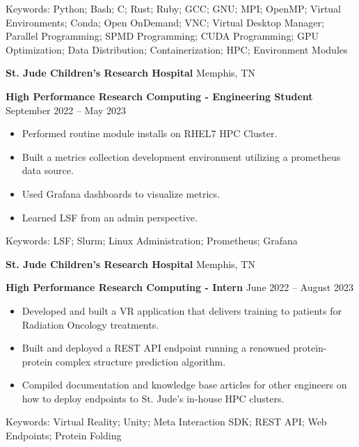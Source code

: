\documentclass[11pt]{article}
\begin{document}
\vspace{6pt}

Keywords: Python; Bash; C; Rust; Ruby; GCC; GNU; MPI; OpenMP; Virtual Environments; Conda; Open OnDemand; VNC; Virtual Desktop Manager; Parallel Programming; SPMD Programming; CUDA Programming; GPU Optimization; Data Distribution; Containerization; HPC; Environment Modules

\vspace{12pt}

\textbf{St. Jude Children's Research Hospital} \hfill Memphis, TN

\textbf{High Performance Research Computing - Engineering Student} \hfill September 2022 – May 2023
\begin{itemize}[noitemsep]
    \item Performed routine module installs on RHEL7 HPC Cluster.
    \item Built a metrics collection development environment utilizing a prometheus data source.
    \item Used Grafana dashboards to visualize metrics.
    \item Learned LSF from an admin perspective.
\end{itemize}

\vspace{6pt}

Keywords: LSF; Slurm; Linux Administration; Prometheus; Grafana

\vspace{12pt}

\textbf{St. Jude Children's Research Hospital} \hfill Memphis, TN

\textbf{High Performance Research Computing - Intern} \hfill June 2022 – August 2023
\begin{itemize}[noitemsep]
    \item Developed and built a VR application that delivers training to patients for Radiation Oncology treatments.
    \item Built and deployed a REST API endpoint running a renowned protein-protein complex structure prediction algorithm.
    \item Compiled documentation and knowledge base articles for other engineers on how to deploy endpoints to St. Jude’s in-house HPC clusters.
\end{itemize}

\vspace{6pt}

Keywords: Virtual Reality; Unity; Meta Interaction SDK; REST API; Web Endpoints; Protein Folding
\end{document}
